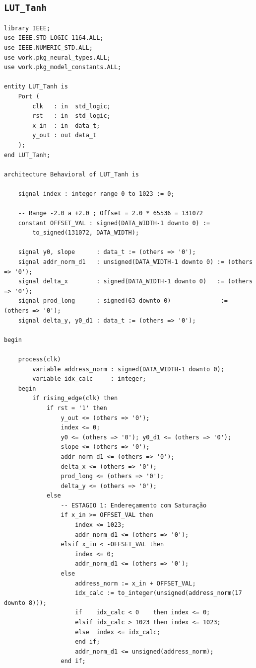 \documentclass[a4paper,12pt]{article}
\begin{document}
\subsection{\texttt{LUT\_Tanh}}

\begin{lstlisting}[style=vhdlstyle,
    caption={C\'odigo VHDL do \texttt{LUT\_Tanh}.},
    label={lst:lut_tanh}]
library IEEE;
use IEEE.STD_LOGIC_1164.ALL;
use IEEE.NUMERIC_STD.ALL;
use work.pkg_neural_types.ALL;
use work.pkg_model_constants.ALL;

entity LUT_Tanh is
    Port (
        clk   : in  std_logic;
        rst   : in  std_logic;
        x_in  : in  data_t;
        y_out : out data_t
    );
end LUT_Tanh;

architecture Behavioral of LUT_Tanh is

    signal index : integer range 0 to 1023 := 0;

    -- Range -2.0 a +2.0 ; Offset = 2.0 * 65536 = 131072
    constant OFFSET_VAL : signed(DATA_WIDTH-1 downto 0) :=
        to_signed(131072, DATA_WIDTH);

    signal y0, slope      : data_t := (others => '0');
    signal addr_norm_d1   : unsigned(DATA_WIDTH-1 downto 0) := (others => '0');
    signal delta_x        : signed(DATA_WIDTH-1 downto 0)   := (others => '0');
    signal prod_long      : signed(63 downto 0)              := (others => '0');
    signal delta_y, y0_d1 : data_t := (others => '0');

begin

    process(clk)
        variable address_norm : signed(DATA_WIDTH-1 downto 0);
        variable idx_calc     : integer;
    begin
        if rising_edge(clk) then
            if rst = '1' then
                y_out <= (others => '0');
                index <= 0;
                y0 <= (others => '0'); y0_d1 <= (others => '0');
                slope <= (others => '0');
                addr_norm_d1 <= (others => '0');
                delta_x <= (others => '0');
                prod_long <= (others => '0');
                delta_y <= (others => '0');
            else
                -- ESTAGIO 1: Endereçamento com Saturação
                if x_in >= OFFSET_VAL then
                    index <= 1023;
                    addr_norm_d1 <= (others => '0');
                elsif x_in < -OFFSET_VAL then
                    index <= 0;
                    addr_norm_d1 <= (others => '0');
                else
                    address_norm := x_in + OFFSET_VAL;
                    idx_calc := to_integer(unsigned(address_norm(17 downto 8)));
                    if    idx_calc < 0    then index <= 0;
                    elsif idx_calc > 1023 then index <= 1023;
                    else  index <= idx_calc;
                    end if;
                    addr_norm_d1 <= unsigned(address_norm);
                end if;


\end{lstlisting}
\end{document}
